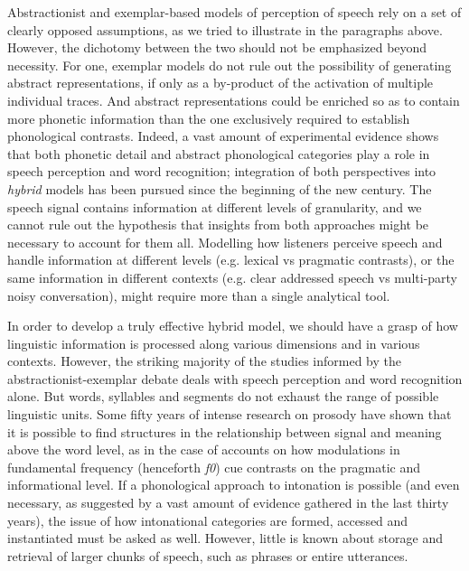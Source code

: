 Abstractionist and exemplar-based models of perception of speech rely on a set of clearly opposed assumptions, as we tried to illustrate in the paragraphs above. However, the dichotomy between the two should not be emphasized beyond necessity. For one, exemplar models do not rule out the possibility of generating abstract representations, if only as a by-product of the activation of multiple individual traces. And abstract representations could be enriched so as to contain more phonetic information than the one exclusively required to establish phonological contrasts. Indeed, a vast amount of experimental evidence shows that both phonetic detail and abstract phonological categories play a role in speech perception and word recognition; integration of both perspectives into \textit{hybrid} models has been pursued since the beginning of the new century. The speech signal contains information at different levels of granularity, and we cannot rule out the hypothesis that insights from both approaches might be necessary to account for them all. Modelling how listeners perceive speech and handle information at different levels (e.g. lexical vs pragmatic contrasts), or the same information in different contexts (e.g. clear addressed speech vs multi-party noisy conversation), might require more than a single analytical tool. 

In order to develop a truly effective hybrid model, we should have a grasp of how linguistic information is processed along various dimensions and in various contexts. However, the striking majority of the studies informed by the abstractionist-exemplar debate deals with speech perception and word recognition alone. But words, syllables and segments do not exhaust the range of possible linguistic units. Some fifty years of intense research on prosody have shown that it is possible to find structures in the relationship between signal and meaning above the word level, as in the case of accounts on how modulations in fundamental frequency (henceforth \textit{f0}) cue contrasts on the pragmatic and informational level. If a phonological approach to intonation is possible (and even necessary, as suggested by a vast amount of evidence gathered in the last thirty years), the issue of how intonational categories are formed, accessed and instantiated must be asked as well. However, little is known about storage and retrieval of larger chunks of speech, such as phrases or entire utterances. 

